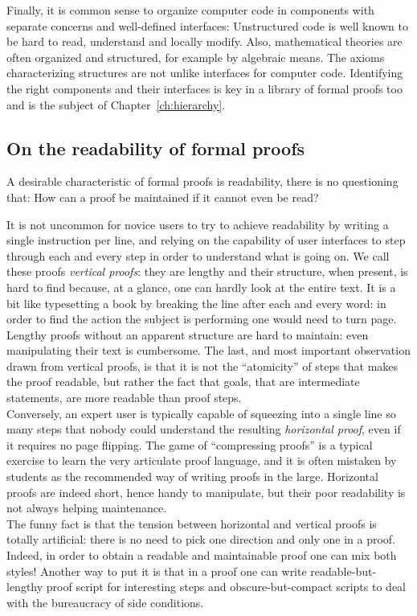Finally, it is common sense to organize computer code
in components with separate concerns and well-defined interfaces:
Unstructured code is  well known to be hard to read, understand and
locally modify.
Also, mathematical theories are often organized and structured, for
example by algebraic means. The axioms characterizing structures
are not unlike interfaces for computer code.
Identifying the right components and their interfaces is key in a library of
formal proofs too and is the subject of Chapter~\ref{ch:hierarchy}.

\subsection{On the readability of formal proofs}

A desirable characteristic of formal proofs is readability,
there is no questioning that: How can a proof be maintained if
it cannot even be read?

It is not uncommon for novice users to try to achieve readability by
writing a single instruction per line, and relying on the capability
of user interfaces to step through each and every step in order to
understand what is going on. We call these proofs \emph{vertical proofs}:
they are lengthy
and their structure, when present, is hard to find
because, at a glance, one can hardly look at the entire text.
It is a bit like
typesetting a book by breaking the line after each and every word: in
order to find the action the subject is performing one would need to
turn page.  
Lengthy proofs without an apparent structure are hard to
maintain: even manipulating their text is cumbersome. The last, and
most important observation drawn from vertical proofs, is that it is
not the ``atomicity'' of steps that makes the proof readable, but
rather the fact that goals, that are intermediate statements, are
more readable than proof steps. \\
Conversely, an expert \mcbSSR{} user is typically capable of squeezing
into a single line so many steps that nobody could understand the
resulting \emph{horizontal proof}, even if it requires no page flipping.
The game of ``compressing proofs''
is a typical exercise to learn the very articulate \mcbSSR{} proof
language, and it is often
mistaken by students as the recommended way of writing proofs in the
large. Horizontal proofs are indeed short, hence handy to
manipulate, but their poor readability is not always helping maintenance.\\
The funny fact is that the tension between horizontal and vertical
proofs is totally artificial: there is no need to pick one direction and only
one in a proof. Indeed, in order to obtain a readable and maintainable proof
one can mix both styles! Another way to put it is that in a proof one
can write readable-but-lengthy proof script for interesting steps
and obscure-but-compact scripts to deal with the bureaucracy of side conditions.

